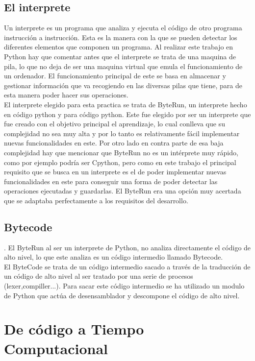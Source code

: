 \subsection{El interprete}

Un interprete es un programa que analiza y ejecuta el código de otro programa instrucción a instrucción. Esta es la manera con la que se pueden detectar los diferentes elementos que componen un programa. Al realizar este trabajo en Python hay que comentar antes que el interprete se trata de una maquina de pila, lo que no deja de ser una maquina virtual que emula el funcionamiento de un ordenador. El funcionamiento principal de este se basa en almacenar y gestionar información que va recogiendo en las diversas pilas que tiene, para de esta manera poder hacer sus operaciones.\\
El interprete elegido para esta practica se trata de ByteRun, un interprete hecho en código python y para código python. Este fue elegido por ser un interprete que fue creado con el objetivo principal el aprendizaje, lo cual conlleva que su complejidad no sea muy alta y por lo tanto es relativamente fácil implementar nuevas funcionalidades en este. Por otro lado en contra parte de esa baja complejidad hay que mencionar que ByteRun no es un intérprete muy rápido, como por ejemplo podría ser Cpython, pero como en este trabajo el principal requisito que se busca en un interprete es el de poder implementar nuevas funcionalidades en este para conseguir una forma de poder detectar las operaciones ejecutadas y guardarlas. El ByteRun era una opción muy acertada que se adaptaba perfectamente a los requisitos del desarrollo.


\subsection{Bytecode}.
El ByteRun al ser un interprete de Python, no analiza directamente el código de alto nivel, lo que este analiza es un código intermedio llamado Bytecode.\\ El ByteCode se trata de un código intermedio sacado a través de la traducción de un código de alto nivel al ser tratado por una serie de procesos (lexer,compiller...). Para sacar este código intermedio se ha utilizado un modulo de Python que  actúa de desensamblador y descompone el código de alto nivel. 




\section{De código a Tiempo Computacional}

